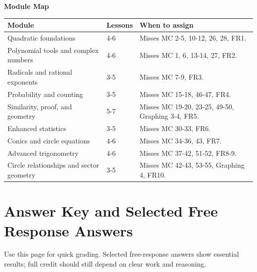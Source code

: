 \documentclass[11pt]{article}
\renewcommand{\arraystretch}{1.18}
\begin{document}
\newpage
\begin{sectionNote}
\textbf{Module Map}
\end{sectionNote}
\begin{center}
\renewcommand{\arraystretch}{1.25}
\begin{tabular}{|L{4.0cm}|L{2.1cm}|L{7.0cm}|}
\hline
\textbf{Module} & \textbf{Lessons} & \textbf{When to assign}\\
\hline
Quadratic foundations & 4-6 & Misses MC 2-5, 10-12, 26, 28, FR1.\\
\hline
Polynomial tools and complex numbers & 4-6 & Misses MC 1, 6, 13-14, 27, FR2.\\
\hline
Radicals and rational exponents & 3-5 & Misses MC 7-9, FR3.\\
\hline
Probability and counting & 3-5 & Misses MC 15-18, 46-47, FR4.\\
\hline
Similarity, proof, and geometry & 5-7 & Misses MC 19-20, 23-25, 49-50, Graphing 3-4, FR5.\\
\hline
Enhanced statistics & 3-5 & Misses MC 30-33, FR6.\\
\hline
Conics and circle equations & 4-6 & Misses MC 34-36, 43, FR7.\\
\hline
Advanced trigonometry & 4-6 & Misses MC 37-42, 51-52, FR8-9.\\
\hline
Circle relationships and sector geometry & 3-5 & Misses MC 42-43, 53-55, Graphing 4, FR10.\\
\hline
\end{tabular}
\end{center}

\newpage
\section*{Answer Key and Selected Free Response Answers}
\begin{sectionNote}
Use this page for quick grading. Selected free-response answers show essential results; full credit should still depend on clear work and reasoning.
\end{sectionNote}
\end{document}

